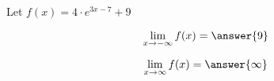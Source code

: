 \documentclass{ximera}
\author{Lee Wayand}
\begin{document}
\begin{exercise}


\begin{question}



Let $f(x) = 4 \cdot e^{3x - 7} + 9$



\[
\lim\limits_{x \to -\infty} f(x) = \answer{9} 
\]


\[
\lim\limits_{x \to \infty} f(x) = \answer{\infty} 
\]


\end{question}










\end{exercise}
\end{document}
